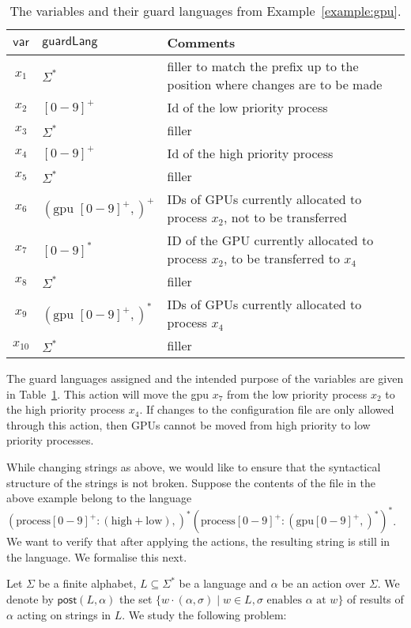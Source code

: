 \documentclass[12pt, a4paper]{article}
\newcommand{\var}{\textsf{var}}
\newcommand{\post}{\textsf{post}}
\newcommand{\ssub}{\sigma} %
\newcommand{\guardL}{\textsf{guardLang}}
\begin{document}
\begin{example}
\begin{table}[t]
	\centering
\begin{tabular}{|c | l  | p{9cm}|}
	\hline
	$\var$ & $\guardL$ & Comments\\
	\hline
	\hline
	$x_1$ & $\Sigma^*$ & filler to match the prefix up to the 
	position where 	changes are to be made\\
	\hline
	$x_2$ & $[0-9]^+$ & Id of the low priority process\\
	\hline
	$x_3$ & $\Sigma^*$ & filler\\
	\hline
	$x_4$ & $[0-9]^+$ & Id of the high priority process\\
	\hline
	$x_5$ & $\Sigma^*$ & filler\\
	\hline
	$x_6$ & $(\text{gpu }[0-9]^+,)^+$ &IDs of GPUs currently allocated 
		to 	process $x_2$,  not to be transferred\\
		\hline
			$x_7$ & $[0-9]^*$ &ID of the GPU currently allocated 
		to 	process $x_2$,   to be transferred to $x_4$\\
		\hline
			$x_8$ & $\Sigma^*$ & filler\\
			\hline
				$x_9$ & $(\text{gpu }[0-9]^+,)^*$ &IDs of GPUs currently allocated 
			to 	process $x_4$\\
			\hline
			$x_{10}$ & $\Sigma^*$ & filler\\
\hline			
\end{tabular}
\caption{The variables and their guard languages from Example~\ref{example:gpu}.}\label{table:gpu}
\end{table}
The guard languages assigned and the intended purpose of the variables 
are given in Table~\ref{table:gpu}.
This action will move the gpu $x_7$ from the low priority process $x_2$ to 
the high priority process $x_4$. If changes to the configuration file 
are only allowed through this action, then GPUs cannot be moved 
from high priority to low priority processes.	
\end{example}
\smallskip

While changing strings as above, we would like to ensure that the 
syntactical structure of the strings is not broken. Suppose the 
contents of the file in the above example belong to the language 
$(\mathrm{process [0-9]^+}:(\mathrm{high}+\mathrm{low}), )^* 
(\mathrm{process}[0-9]^+:(\mathrm{gpu}[0-9]^+,)^*)^*$. We want to verify that after applying the actions, the resulting string is still in the 
language. We formalise this next.

Let $\Sigma$ be a finite alphabet, $L \subseteq \Sigma^*$ be a language and $\alpha$ be an action over $\Sigma$. We denote by
$\post(L, \alpha)$ the set $\{w \cdot (\alpha, \ssub) \mid  w \in L, \ssub \text{ enables } \alpha \text{ at } w\}$ of results of $\alpha$ acting on strings in $L$. We study the following problem:
\medskip
\end{document}
